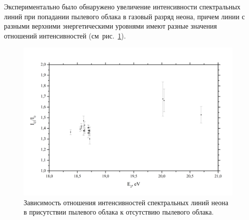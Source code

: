Экспериментально было обнаружено увеличение интенсивности спектральных линий при попадании пылевого облака
в газовый разряд неона, причем линии с разными верхними энергетическими уровнями имеют разные значения
отношений интенсивностей (см~рис.~\ref{fig:fig35}).
\begin{figure}
    \centering
    \includegraphics[width=15cm]{figures/fig35}
    \caption{Зависимость отношения интенсивностей спектральных линий неона в присутствии пылевого облака к отсутствию пылевого облака.}
    \label{fig:fig35}
\end{figure}